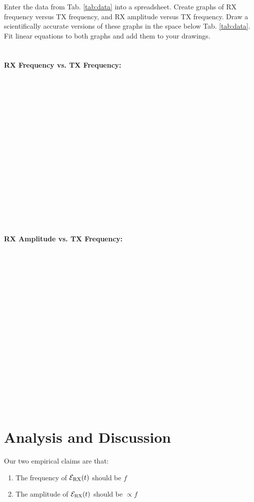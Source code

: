 \documentclass[12pt,twocolumn]{article}
\begin{document}
Enter the data from Tab. \ref{tab:data} into a spreadsheet.  Create graphs of RX frequency versus TX frequency, and RX amplitude versus TX frequency.  Draw a scientifically accurate versions of these graphs in the space below Tab. \ref{tab:data}.  Fit linear equations to both graphs and add them to your drawings. \\ \\ \\
\noindent
\textbf{RX Frequency vs. TX Frequency:} \\ \\ \\ \\ \\ \\ \\ \\ \\ \\ \\ \\ \\ \\ \\ \\ \\ \\
\noindent
\textbf{RX Amplitude vs. TX Frequency:} \\ \\ \\ \\ \\ \\ \\ \\ \\ \\ \\ \\ \\ \\ \\ \\ \\ \\

\section{Analysis and Discussion}

Our two empirical claims are that:

\begin{enumerate}
\item The frequency of $\mathcal{E}_{\rm RX}(t)$ should be $f$
\item The amplitude of $\mathcal{E_{\rm RX}}(t)$ should be $\propto f$
\end{enumerate}
\end{document}
